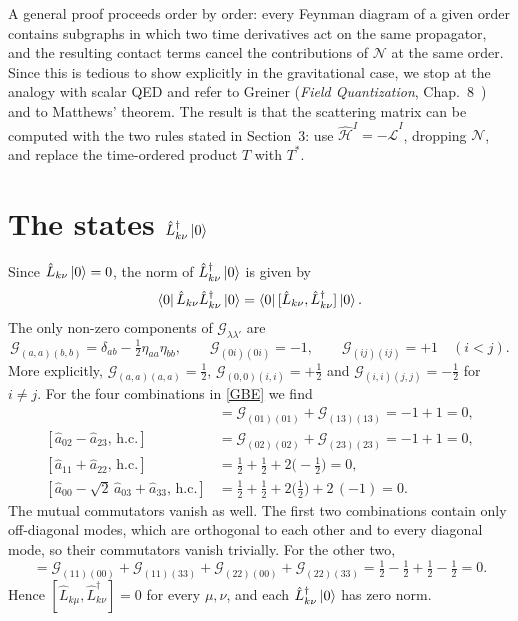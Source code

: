 \documentclass[12pt,a4paper,oneside]{article}
\numberwithin{equation}{section}   %
\begin{document}
A general proof proceeds order by order: every Feynman diagram of a given
order contains subgraphs in which two time derivatives act on the same
propagator, and the resulting contact terms cancel the contributions of
$\mathcal N$ at the same order. Since this is tedious to show explicitly in the
gravitational case, we stop at the analogy with scalar QED and refer to Greiner
(\textit{Field Quantization}, Chap.~8~\cite{GreinerFQ}) and to Matthews' theorem. The result is
that the scattering matrix can be computed with the two rules stated in
Section~3: use $\hat{\mathcal H}^I=-\hat{\mathcal L}^I$, dropping $\mathcal N$,
and replace the time-ordered product $T$ with $T^*$.


\section{The states $\hat L^\dagger_{k\nu}\ket{0}$}
\label{app:Lstates}

Since $\hat L_{k\nu}\ket0=0$, the norm of $\hat L^\dagger_{k\nu}\ket0$ is given by
\begin{equation}
  \bra0\hat L_{k\nu}\hat L^\dagger_{k\nu}\ket0
  =\bra0[\hat L_{k\nu},\hat L^\dagger_{k\nu}]\ket0 .
\end{equation}
The only non-zero components of $\mathcal G_{\lambda\lambda'}$ are
\begin{equation}
  \mathcal G_{(a,a)(b,b)}=\delta_{ab}-\tfrac12 \eta_{aa}\eta_{bb},\qquad
  \mathcal G_{(0i)(0i)}=-1,\qquad
  \mathcal G_{(ij)(ij)}=+1 \quad (i<j).
\end{equation}
More explicitly,
$\mathcal G_{(a,a)(a,a)}=\tfrac12$, $\mathcal G_{(0,0)(i,i)}=+\tfrac12$ and
$\mathcal G_{(i,i)(j,j)}=-\tfrac12$ for $i\neq j$.
For the four combinations in \eqref{GBE} we find
\begin{align}
  [\hat a_{01}-\hat a_{13},\,\text{h.c.}]
    &=\mathcal G_{(01)(01)}+\mathcal G_{(13)(13)}=-1+1=0,\\
  [\hat a_{02}-\hat a_{23},\,\text{h.c.}]
    &=\mathcal G_{(02)(02)}+\mathcal G_{(23)(23)}=-1+1=0,\\
  [\hat a_{11}+\hat a_{22},\,\text{h.c.}]
    &=\tfrac12+\tfrac12+2\bigl(-\tfrac12\bigr)=0,\\
  [\hat a_{00}-\sqrt2\,\hat a_{03}+\hat a_{33},\,\text{h.c.}]
    &=\tfrac12+\tfrac12+2\bigl(\tfrac12\bigr)+2\,(-1)=0 .
\end{align}
The mutual commutators vanish as well. The first two combinations contain only
off-diagonal modes, which are orthogonal to each other and to every diagonal
mode, so their commutators vanish trivially. For the other two,
\begin{equation}
  [\hat a_{11}+\hat a_{22},\,
   \hat a^\dagger_{00}-\sqrt2\,\hat a^\dagger_{03}+\hat a^\dagger_{33}]
  =\mathcal G_{(11)(00)}+\mathcal G_{(11)(33)}+\mathcal G_{(22)(00)}+\mathcal G_{(22)(33)}
  =\tfrac12-\tfrac12+\tfrac12-\tfrac12=0 .
\end{equation}
Hence $[\hat L_{k\mu},\hat L^\dagger_{k\nu}]=0$ for every $\mu,\nu$, and each
$\hat L^\dagger_{k\nu}\ket0$ has zero norm.
\end{document}
